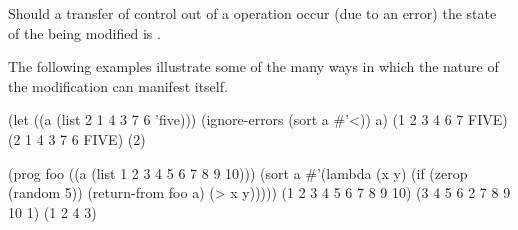 


Should a transfer of control out of a  operation occur
(\eg due to an error) the state of the  being modified is
.


The following examples illustrate some of the many ways in which the
 nature of the modification can manifest
itself.

\code
 (let ((a (list 2 1 4 3 7 6 'five)))
   (ignore-errors (sort a #'<))
   a)
\EV (1 2 3 4 6 7 FIVE)
\OV (2 1 4 3 7 6 FIVE)
\OV (2)

 (prog foo ((a (list 1 2 3 4 5 6 7 8 9 10)))
   (sort a #'(lambda (x y) (if (zerop (random 5)) (return-from foo a) (> x y)))))
\EV (1 2 3 4 5 6 7 8 9 10)
\OV (3 4 5 6 2 7 8 9 10 1)
\OV (1 2 4 3)
\endcode

\endsubsubsection%

\endsubsection%
